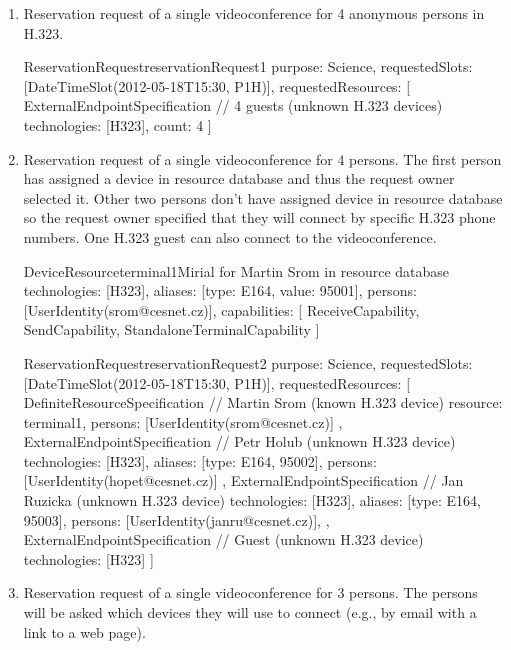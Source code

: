 \begin{enumerate}
\item Reservation request of a single videoconference for 4 anonymous persons in H.323.

\begin{EntityExample}{ReservationRequest}{reservationRequest1}{}
purpose: Science,
requestedSlots: [DateTimeSlot(2012-05-18T15:30, P1H)],
requestedResources: [
  ExternalEndpointSpecification { // 4 guests (unknown H.323 devices)
    technologies: [H323],
    count: 4
  }
]
\end{EntityExample}

\item Reservation request of a single videoconference for 4 persons. The first person  has assigned a device in resource database and thus the request owner selected it. Other two persons don't have assigned device in resource database so the request owner specified that they will connect by specific H.323 phone numbers. One H.323 guest can also connect to the videoconference.

\begin{EntityExample}{DeviceResource}{terminal1}{Mirial for Martin Srom in resource database}
technologies: [H323], 
aliases: [{type: E164, value: 95001}],
persons: [UserIdentity(srom@cesnet.cz)],
capabilities: [
  ReceiveCapability, SendCapability, StandaloneTerminalCapability
]
\end{EntityExample}

\begin{EntityExample}{ReservationRequest}{reservationRequest2}{}
purpose: Science,
requestedSlots: [DateTimeSlot(2012-05-18T15:30, P1H)],
requestedResources: [
  DefiniteResourceSpecification { // Martin Srom (known H.323 device)
    resource: terminal1,
    persons: [UserIdentity(srom@cesnet.cz)] 
  },
  ExternalEndpointSpecification { // Petr Holub (unknown H.323 device)
    technologies: [H323],
    aliases: [{type: E164, 95002}],
    persons: [UserIdentity(hopet@cesnet.cz)]
  },
  ExternalEndpointSpecification { // Jan Ruzicka (unknown H.323 device)
    technologies: [H323],
    aliases: [{type: E164, 95003}],
    persons: [UserIdentity(janru@cesnet.cz)], 
  },
  ExternalEndpointSpecification { // Guest (unknown H.323 device)
    technologies: [H323]
  }
]
\end{EntityExample}

\item Reservation request of a single videoconference for 3 persons. The persons will be asked which devices they will use to connect (e.g., by email with a link to a web page).


\end{enumerate}
